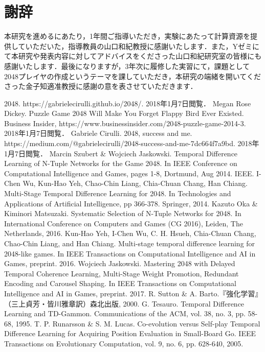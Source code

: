 \documentclass{suribt}
\begin{document}
\backmatter
\chapter{謝辞}
本研究を進めるにあたり，1年間ご指導いただき，実験にあたって計算資源を提供していただいた，指導教員の山口和紀教授に感謝いたします．また，Yゼミにて本研究や発表内容に対してアドバイスをくださった山口和紀研究室の皆様にも感謝いたします．最後になりますが，3年次に履修した実習にて，課題として2048プレイヤの作成というテーマを課していただき，本研究の端緒を開いてくださった金子知適准教授に感謝の意を表させていただきます．

\begin{thebibliography}{}
  2048. https://gabrielecirulli.github.io/2048/. 2018年1月7日閲覧．
  Megan Rose Dickey. Puzzle Game 2048 Will Make You Forget Flappy Bird Ever Existed. Business Insider, https://www.businessinsider.com/2048-puzzle-game-2014-3. 2018年1月7日閲覧．
  Gabriele Cirulli. 2048, success and me. https://medium.com/@gabrielecirulli/2048-success-and-me-7dc664f7a9bd. 2018年1月7日閲覧．
  Marcin Szubert \& Wojciech Jaskowski. Temporal Difference Learning of N-Tuple Networks for the Game 2048. In IEEE Conference on Computational Intelligence and Games, pages 1-8, Dortmund, Aug 2014. IEEE.
  I-Chen Wu, Kun-Hao Yeh, Chao-Chin Liang, Chia-Chuan Chang, Han Chiang. Multi-Stage Temporal Difference Learning for 2048. In Technologies and Applications of Artificial Intelligence, pp 366-378. Springer, 2014.
  Kazuto Oka \& Kiminori Matsuzaki. Systematic Selection of N-Tuple Networks for 2048. In International Conference on Computers and Games (CG 2016), Leiden, The Netherlands, 2016.
  Kun-Hao Yeh, I-Chen Wu, C. H. Hsueh, Chia-Chuan Chang, Chao-Chin Liang, and Han Chiang. Multi-stage temporal difference learning for 2048-like games. In IEEE Transactions on Computational Intelligence and AI in Games, preprint. 2016.
  Wojciech Jaskowski. Mastering 2048 with Delayed Temporal Coherence Learning, Multi-Stage Weight Promotion, Redundant Encoding and Carousel Shaping. In IEEE Transactions on Computational Intelligence and AI in Games, preprint. 2017.
  R. Sutton \& A. Barto.『強化学習』（三上貞芳・皆川雅章訳）森北出版, 2000.
  G. Tesauro. Temporal Difference Learning and TD-Gammon. Communications of the ACM, vol. 38, no. 3, pp. 58-68, 1995.
  T. P. Runarsson \& S. M. Lucas. Co-evolution versus Self-play Temporal Difference Learning for Acquiring Position Evaluation in Small-Board Go. IEEE Transactions on Evolutionary Computation, vol. 9, no. 6, pp. 628-640, 2005.

\end{thebibliography}
\end{document}
